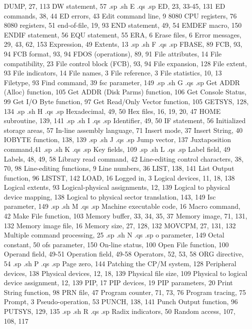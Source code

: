 DUMP, 27, 113
DW statement, 57
.sp
.sh
E
.qs
.sp
ED, 23, 33-45, 131
ED commands, 38, 44
ED errors, 43
Edit command line, 9
8080 CPU registers, 76
8080 registers, 51
end-of-file, 19, 93
END statement, 49, 54
EMDEF macro, 150
ENDIF statement, 56
EQU statement, 55
ERA, 6
Erase files, 6
Error messages, 29, 43,
    62, 153
Expression, 49
Extents, 13
.sp
.sh
F
.qs
.sp
FBASE, 89
FCB, 93, 94
FCB format, 93, 94
FDOS (operations), 89, 91
File attributes, 14
File compatibility, 23
File control block (FCB),
    93, 94
File expansion, 128
File extent, 93
File indicators, 14
File names, 3
File reference, 3
File statistics, 10, 13
Filetype, 93
Find command, 39
fsc parameter, 149
.sp
.sh
G
.qs
.sp
Get ADDR (Alloc) function,
    105
Get ADDR (Disk Parms)
    function, 106
Get Console Status, 99
Get I/O Byte function, 97
Get Read/Only Vector
    function, 105
GETSYS, 128, 134
.sp
.sh
H
.qs
.sp
Hexadecimal, 49, 50
Hex files, 16, 19, 20, 47
HOME subroutine, 139, 141
.sp
.sh
I
.qs
.sp
Identifier, 49, 50
IF statement, 56
Initialized storage areas, 57
In-line assembly language, 71
Insert mode, 37
Insert String, 40
IOBYTE function, 138, 139
.sp
.sh
J
.qs
.sp
Jump vector, 137
Juxtaposition command,41
.sp
.sh
K
.qs
.sp
Key fields, 109
.sp
.sh
L
.qs
.sp
Label field, 49
Labels, 48, 49, 58
Library read command, 42
Line-editing control
    characters, 38, 70, 98
Line-editing functions, 9
Line numbers, 36
LIST, 138, 141
List Output function, 96
LISTST, 142
LOAD, 16
Logged in, 3
Logical devices, 11, 18, 138
Logical extents, 93
Logical-physical assignments,
   12, 139
Logical to physical device
    mapping, 138
Logical to physical sector
    translation, 143, 149
Isc parameter, 149
.sp
.sh
M
.qs
.sp
Machine executable code, 16
Macro command, 42
Make File function, 103
Memory buffer, 33, 34, 35, 37
Memory image, 71, 131, 132
Memory image file, 16
Memory size, 27, 128, 132
MOVCPM, 27, 131, 132
Multiple command
    processing, 25
.sp
.sh
N
.qs
.sp
{o} parameter, 149
Octal constant, 50
ofs parameter, 150
On-line status, 100
Open File function, 100
Operand field, 49-51
Operation field, 49-58
Operators, 52, 53, 58
ORG directive, 54
.sp
.sh
P
.qs
.sp
Page zero, 144
Patching the CP/M system, 128
Peripheral devices, 138
Physical devices, 12, 18, 139
Physical file size, 109
Physical to logical device
    assignment, 12, 139
PIP, 17
PIP devices, 19
PIP parameters, 20
Print String function, 98
PRN file, 47
Program counter, 71, 73, 76
Program tracing, 75
Prompt, 3
Pseudo-operation, 53
PUNCH, 138, 141
Punch Output function, 96
PUTSYS, 129, 135
.sp
.sh
R
.qs
.sp
Radix indicators, 50
Random access, 107, 108, 117
